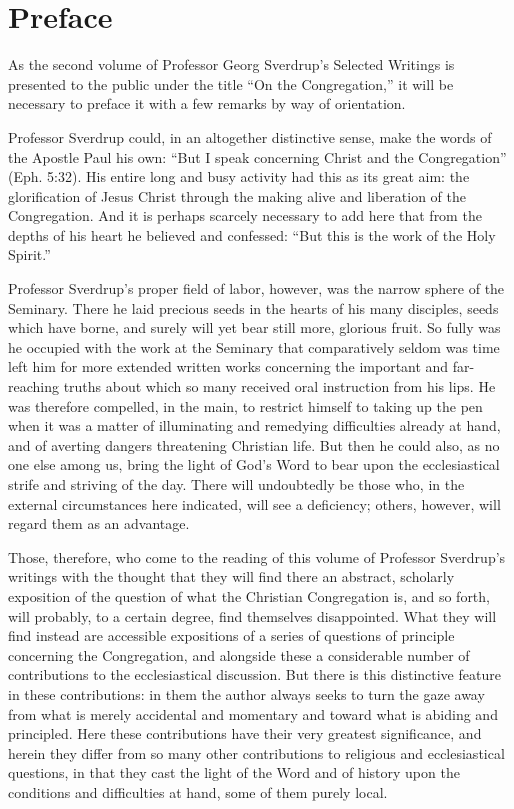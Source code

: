 
\section*{Preface}

As the second volume of Professor Georg Sverdrup’s Selected Writings is presented to the public under the title “On the Congregation,” it will be necessary to preface it with a few remarks by way of orientation.

Professor Sverdrup could, in an altogether distinctive sense, make the words of the Apostle Paul his own: “But I speak concerning Christ and the Congregation” (Eph. 5:32). His entire long and busy activity had this as its great aim: the glorification of Jesus Christ through the making alive and liberation of the Congregation. And it is perhaps scarcely necessary to add here that from the depths of his heart he believed and confessed: “But this is the work of the Holy Spirit.”

Professor Sverdrup’s proper field of labor, however, was the narrow sphere of the Seminary. There he laid precious seeds in the hearts of his many disciples, seeds which have borne, and surely will yet bear still more, glorious fruit. So fully was he occupied with the work at the Seminary that comparatively seldom was time left him for more extended written works concerning the important and far-reaching truths about which so many received oral instruction from his lips. He was therefore compelled, in the main, to restrict himself to taking up the pen when it was a matter of illuminating and remedying difficulties already at hand, and of averting dangers threatening Christian life. But then he could also, as no one else among us, bring the light of God’s Word to bear upon the ecclesiastical strife and striving of the day. There will undoubtedly be those who, in the external circumstances here indicated, will see a deficiency; others, however, will regard them as an advantage.

Those, therefore, who come to the reading of this volume of Professor Sverdrup’s writings with the thought that they will find there an abstract, scholarly exposition of the question of what the Christian Congregation is, and so forth, will probably, to a certain degree, find themselves disappointed. What they will find instead are accessible expositions of a series of questions of principle concerning the Congregation, and alongside these a considerable number of contributions to the ecclesiastical discussion. But there is this distinctive feature in these contributions: in them the author always seeks to turn the gaze away from what is merely accidental and momentary and toward what is abiding and principled. Here these contributions have their very greatest significance, and herein they differ from so many other contributions to religious and ecclesiastical questions, in that they cast the light of the Word and of history upon the conditions and difficulties at hand, some of them purely local.

